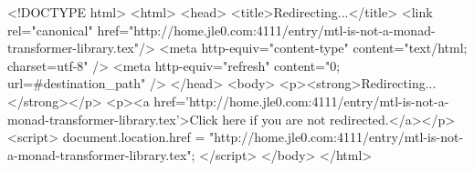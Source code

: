 <!DOCTYPE html>
<html>
<head>
<title>Redirecting...</title>
<link rel="canonical" href="http://home.jle0.com:4111/entry/mtl-is-not-a-monad-transformer-library.tex"/>
<meta http-equiv="content-type" content="text/html; charset=utf-8" />
<meta http-equiv="refresh" content="0; url=#{destination_path}" />
</head>
<body>
  <p><strong>Redirecting...</strong></p>
  <p><a href='http://home.jle0.com:4111/entry/mtl-is-not-a-monad-transformer-library.tex'>Click here if you are not redirected.</a></p>
  <script>
    document.location.href = "http://home.jle0.com:4111/entry/mtl-is-not-a-monad-transformer-library.tex";
  </script>
</body>
</html>
